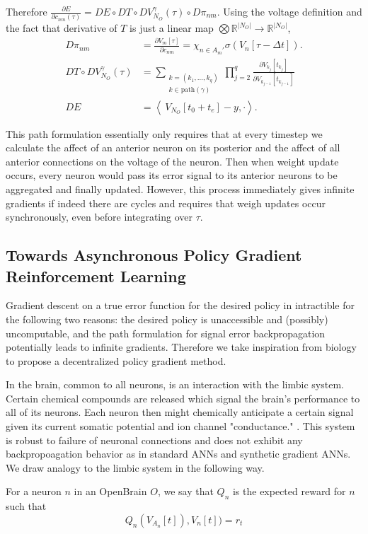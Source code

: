 	Therefore $\frac{\partial E}{\partial c_{nm}(\tau)} = DE \circ DT \circ DV_{N_O}^\gamma(\tau) \circ D\pi_{nm}$. Using the voltage definition and the fact that derivative of $T$ is just a linear map $\bigotimes \mathbb{R}^{|N_O|} \to \mathbb{R}^{|N_O|}$,
	\begin{equation}
		\begin{aligned}
			D\pi_{nm} &= \frac{\partial V_m[\tau]}{\partial c_{nm}} = \chi_{n \in A_m'} \sigma(V_n[\tau-\Delta t]). \\
			DT\circ DV^{\gamma}_{N_O}(\tau)
				&= \sum_{
					\substack{
						k = (k_1, \dots, k_q)\\
						k \in \text{path}(\gamma)
					}} 
				\prod_{j=2}^{q}
				 	\frac{\partial V_{k_j}[t_{k_j}]}{\partial V_{k_{j-1}}[t_{k_{j-1}}]} \\
				 	DE &= \left\langle\ V_{N_O}[t_0 + t_e] - y, \cdot \right\rangle. 
		\end{aligned}
	\end{equation}

	This path formulation essentially only requires that at every timestep we calculate the affect of an anterior neuron on its posterior and the affect of all anterior connections on the voltage of the neuron.  Then when weight update occurs, every neuron would pass its error signal to its anterior neurons to be aggregated and finally updated. However, this process immediately gives infinite gradients if indeed there are cycles and requires that weigh updates occur synchronously, even before integrating over $\tau.$

\subsection{Towards Asynchronous Policy Gradient Reinforcement Learning}

	Gradient descent on a true error function for the desired policy in intractible for the following two reasons: the desired policy is unaccessible and (possibly) uncomputable, and the path formulation for signal error backpropagation potentially leads to infinite gradients. Therefore we take inspiration from biology to propose a decentralized policy gradient method.

	In the brain, common to all neurons, is an interaction with the limbic system.  Certain chemical compounds are released which signal the brain's performance to all of its neurons. Each neuron then might chemically anticipate a certain signal given its current somatic potential and ion channel "conductance."  . This system is robust to failure of neuronal connections and does not exhibit any backpropoagation behavior as in standard ANNs and synthetic gradient ANNs. We draw analogy to the limbic system in the following way. 

	\begin{definition}
		For a neuron $n$ in an OpenBrain $O$, we say that $Q_n$ is the expected reward for $n$ such that
		\begin{equation}
			Q_n(V_{A_n}[t]), V_n[t]) = r_t	
		\end{equation}
	\end{definition}

